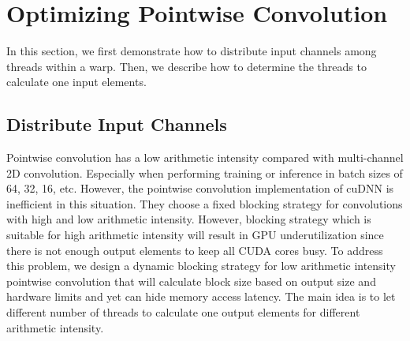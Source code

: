 \section{Optimizing Pointwise Convolution}
In this section, we first demonstrate how to distribute input channels among threads within a warp. 
Then, we describe how to determine the threads to calculate one input elements.
\subsection{Distribute Input Channels}
Pointwise convolution has a low arithmetic intensity compared with multi-channel 2D convolution. 
Especially when performing training or inference in batch sizes of 64, 32, 16, etc.
However, the pointwise convolution implementation of cuDNN is inefficient in this situation. 
They choose a fixed blocking strategy for convolutions with high and low arithmetic intensity. 
However, blocking strategy which is suitable for high arithmetic intensity will result in GPU underutilization since there is not enough output elements to keep all CUDA cores busy.
To address this problem, we design a dynamic blocking strategy for low arithmetic intensity pointwise convolution that will calculate block size based on output size and hardware limits and yet can hide memory access latency.
The main idea is to let different number of threads to calculate one output elements for different arithmetic intensity.

